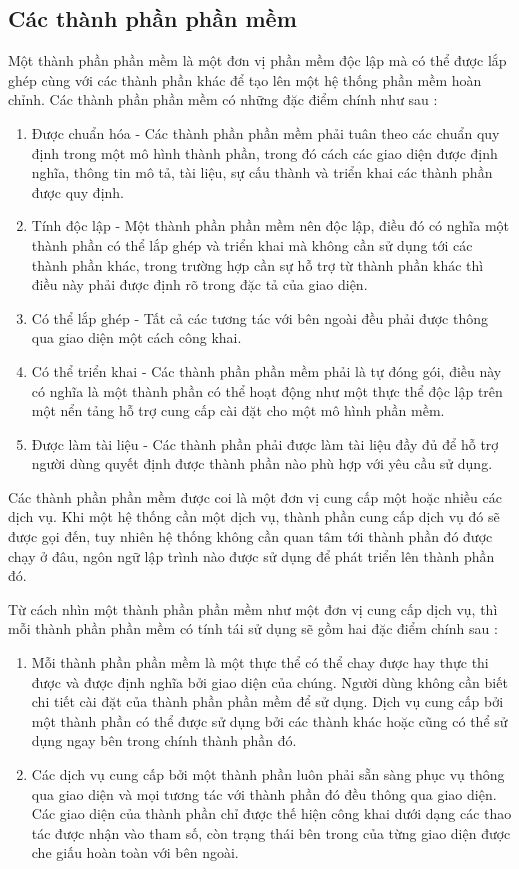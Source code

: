 \subsection{Các thành phần phần mềm}
Một thành phần phần mềm là một đơn vị phần mềm độc lập mà có thể được lắp ghép cùng với các thành phần khác để tạo lên một hệ thống phần mềm hoàn chỉnh. Các thành phần phần mềm có những đặc điểm chính như sau : 
\begin{enumerate}
  \item Được chuẩn hóa - Các thành phần phần mềm phải tuân theo các chuẩn quy định trong một mô hình thành phần, trong đó cách các giao diện được định nghĩa, thông tin mô tả, tài liệu, sự cấu thành và triển khai các thành phần được quy định.
	\item Tính độc lập - Một thành phần phần mềm nên độc lập, điều đó có nghĩa một thành phần có thể lắp ghép và triển khai mà không cần sử dụng tới các thành phần khác, trong trường hợp cần sự hỗ trợ từ thành phần khác thì điều này phải được định rõ trong đặc tả của giao diện.
	\item Có thể lắp ghép - Tất cả các tương tác với bên ngoài đều phải được thông qua giao diện một cách công khai.
	\item Có thể triển khai - Các thành phần phần mềm phải là tự đóng gói, điều này có nghĩa là một thành phần có thể hoạt động như một thực thể độc lập trên một nển tảng hỗ trợ cung cấp cài đặt cho một mô hình phần mềm.
	\item Được làm tài liệu - Các thành phần phải được làm tài liệu đầy đủ để hỗ trợ người dùng quyết định được thành phần nào phù hợp với yêu cầu sử dụng.
\end{enumerate}

Các thành phần phần mềm được coi là một đơn vị cung cấp một hoặc nhiều các dịch vụ. Khi một hệ thống cần một dịch vụ, thành phần cung cấp dịch vụ đó sẽ được gọi đến, tuy nhiên hệ thống không cần quan tâm tới thành phần đó được chạy ở đâu, ngôn ngữ lập trình nào được sử dụng để phát triển lên thành phần đó.

Từ cách nhìn một thành phần phần mềm như một đơn vị cung cấp dịch vụ, thì mỗi thành phần phần mềm có tính tái sử dụng sẽ gồm hai đặc điểm chính sau :

\begin{enumerate}
  \item Mỗi thành phần phần mềm là một thực thể có thể chay được hay thực thi được và được định nghĩa bởi giao diện của chúng. Người dùng không cần biết chi tiết cài đặt của thành phần phần mềm để sử dụng. Dịch vụ cung cấp bởi một thành phần có thể được sử dụng bởi các thành khác hoặc cũng có thể sử dụng ngay bên trong chính thành phần đó.
	\item Các dịch vụ cung cấp bởi một thành phần luôn phải sẵn sàng phục vụ thông qua giao diện và mọi tương tác với thành phần đó đều thông qua giao diện. Các giao diện của thành phần chỉ được thế hiện công khai dưới dạng các thao tác được nhận vào tham số, còn trạng thái bên trong của từng giao diện được che giấu hoàn toàn với bên ngoài.
\end{enumerate}

